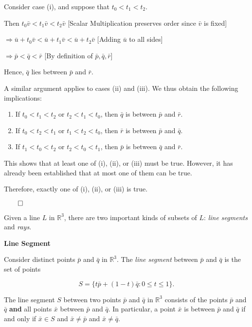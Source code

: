 \begin{proofbox}

  Consider case (i), and suppose that $t_0 < t_1 < t_2$.

  Then $t_0\bar{v} < t_1\bar{v} < t_2\bar{v}$ \hfill [Scalar Multiplication preserves order since $\bar{v}$ is fixed]

  \quad $\Rightarrow \bar{u} + t_0\bar{v} < \bar{u} + t_1\bar{v} < \bar{u} + t_2\bar{v}$ \hfill [Adding $\bar{u}$ to all sides]

  \quad $\Rightarrow \bar{p} < \bar{q} < \bar{r}$ \hfill [By definition of $\bar{p}, \bar{q}, \bar{r}$]

  Hence, $\bar{q}$ lies between $\bar{p}$ and $\bar{r}$.

  A similar argument applies to cases (ii) and (iii). We thus obtain the following implications:
  \begin{enumerate}
    \renewcommand{\labelenumi}{(\roman{enumi})}
    \item If $t_0 < t_1 < t_2$ or $t_2 < t_1 < t_0$, then $\bar{q}$ is between $\bar{p}$ and $\bar{r}$.
    \item If $t_0 < t_2 < t_1$ or $t_1 < t_2 < t_0$, then $\bar{r}$ is between $\bar{p}$ and $\bar{q}$.
    \item If $t_1 < t_0 < t_2$ or $t_2 < t_0 < t_1$, then $\bar{p}$ is between $\bar{q}$ and $\bar{r}$.
  \end{enumerate}

  This shows that at least one of (i), (ii), or (iii) must be true. However, it has already been established that at most one of them can be true.

  Therefore, exactly one of (i), (ii), or (iii) is true.

  \hfill $\qed$

\end{proofbox}

Given a line $L$ in $\mathbb{R}^3$, there are two important kinds of subsets of $L$: \textit{line segments} and \textit{rays}.

\begin{definitionbox}
  \textbf{Line Segment}

  Consider distinct points $\bar{p}$ and $\bar{q}$ in $\mathbb{R}^3$. The \textit{line segment} between
  $\bar{p}$ and $\bar{q}$ is the set of points

  \[
    S = \{t\bar{p} + (1 - t)\bar{q} : 0 \leq t \leq 1 \}.
  \]
\end{definitionbox}

\begin{remarkbox}
  The line segment $S$ between two points $\bar{p}$ and $\bar{q}$ in $\mathbb{R}^3$ consists of the points $\bar{p}$ and $\bar{q}$ \textbf{and} all points $\bar{x}$ 
  between $\bar{p}$ and $\bar{q}$. In particular, a point $\bar{x}$ is between $\bar{p}$ and $\bar{q}$ if and only if
  $\bar{x} \in S$ and $\bar{x} \neq \bar{p}$ and $\bar{x} \neq \bar{q}$.
\end{remarkbox}

